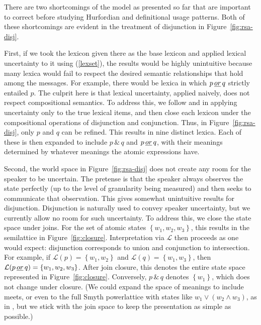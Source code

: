 \documentclass[12pt,twoside]{article}
\newcommand{\figref}[1]{Figure~\ref{#1}}
\newcommand{\subeg}[2]{(\ref{#2})}
\newcommand{\word}[1]{\emph{#1}}
\newcommand{\set}[1]{\ensuremath{\left\{ #1 \right\}}}
\newcommand{\Lex}{\mathcal{L}}
\newcommand{\porq}{p\,\word{or}\,q}
\newcommand{\pandq}{p\,\&\,q}
\renewcommand{\_}{\textbf{\textunderscore\hspace{-4pt}\textunderscore\hspace{-3pt}\textunderscore\hspace{-4pt}\textunderscore}\hspace{0.5pt}}			%
\begin{document}
There are two shortcomings of the model as presented so far that are
important to correct before studying Hurfordian and definitional usage
patterns. Both of these shortcomings are evident in the treatment of
disjunction in \figref{fig:rsa-disj}.

First, if we took the lexicon given there as the base lexicon and
applied lexical uncertainty to it using \subeg{model-extend}{lexset},
the results would be highly unintuitive because many lexica would fail
to respect the desired semantic relationships that hold among the
messages. For example, there would be lexica in which $\porq$ strictly
entailed $p$. The culprit here is that lexical uncertainty, applied
naively, does not respect compositional semantics.  To address this,
we follow \citet{bergen-levy-goodman:2014} and
\citet{levy-bergen-goodman:2014SALT} in applying uncertainty only to
the true lexical items, and then close each lexicon under the
compositional operations of disjunction and conjunction. Thus, in
\figref{fig:rsa-disj}, only $p$ and $q$ can be refined.  This results
in nine distinct lexica.  Each of these is then expanded to include
$\pandq$ and $\porq$, with their meanings determined by whatever
meanings the atomic expressions have.  

Second, the world space in \figref{fig:rsa-disj} does not create any
room for the speaker to be uncertain. The pretense is that the speaker
always observes the state perfectly (up to the level of granularity
being measured) and then seeks to communicate that observation. This
gives somewhat unintuitive results for disjunction. Disjunction is
naturally used to convey speaker uncertainty, but we currently allow
no room for such uncertainty.  To address this, we close the state
space under joins.  For the set of atomic states
$\set{w_{1}, w_{2}, w_{3}}$, this results in the semilattice in
\figref{fig:closure}. Interpretation via $\Lex$ then proceeds as one
would expect: disjunction corresponds to union and conjunction to
intersection. For example, if $\Lex(p) = \set{w_{1}, w_{2}}$ and
$\Lex(q) = \set{w_{1}, w_{3}}$, then
$\Lex(\porq) = \set{w_{1}, w_{2}, w_{3}}$.  After join closure, this
denotes the entire state space represented in
\figref{fig:closure}. Conversely, $\pandq$ denotes $\set{w_{1}}$,
which does not change under closure. (We could expand the space of
meanings to include meets, or even to the full Smyth powerlattice with
states like $w_{1}{\vee} (w_{2}{\wedge} w_{3})$, as in
\citealt{levy-pollard:2001}, but we stick with the join space to keep
the presentation as simple as possible.)
\end{document}
